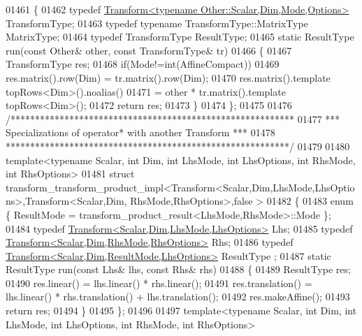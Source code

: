\begin{DoxyCode}
01461 \{
01462   \textcolor{keyword}{typedef} \hyperlink{group___geometry___module_class_eigen_1_1_transform}{Transform<typename Other::Scalar,Dim,Mode,Options>}
       TransformType;
01463   \textcolor{keyword}{typedef} \textcolor{keyword}{typename} TransformType::MatrixType MatrixType;
01464   \textcolor{keyword}{typedef} TransformType ResultType;
01465   \textcolor{keyword}{static} ResultType run(\textcolor{keyword}{const} Other& other, \textcolor{keyword}{const} TransformType& tr)
01466   \{
01467     TransformType res;
01468     \textcolor{keywordflow}{if}(Mode!=\textcolor{keywordtype}{int}(AffineCompact))
01469       res.matrix().row(Dim) = tr.matrix().row(Dim);
01470     res.matrix().template topRows<Dim>().noalias()
01471       = other * tr.matrix().template topRows<Dim>();
01472     \textcolor{keywordflow}{return} res;
01473   \}
01474 \};
01475 
01476 \textcolor{comment}{/**********************************************************}
01477 \textcolor{comment}{*** Specializations of operator* with another Transform ***}
01478 \textcolor{comment}{**********************************************************/}
01479 
01480 \textcolor{keyword}{template}<\textcolor{keyword}{typename} Scalar, \textcolor{keywordtype}{int} Dim, \textcolor{keywordtype}{int} LhsMode, \textcolor{keywordtype}{int} LhsOptions, \textcolor{keywordtype}{int} RhsMode, \textcolor{keywordtype}{int} RhsOptions>
01481 \textcolor{keyword}{struct }transform\_transform\_product\_impl<Transform<Scalar,Dim,LhsMode,LhsOptions>,Transform<Scalar,Dim,
      RhsMode,RhsOptions>,false >
01482 \{
01483   \textcolor{keyword}{enum} \{ ResultMode = transform\_product\_result<LhsMode,RhsMode>::Mode \};
01484   \textcolor{keyword}{typedef} \hyperlink{group___geometry___module_class_eigen_1_1_transform}{Transform<Scalar,Dim,LhsMode,LhsOptions>} Lhs;
01485   \textcolor{keyword}{typedef} \hyperlink{group___geometry___module_class_eigen_1_1_transform}{Transform<Scalar,Dim,RhsMode,RhsOptions>} Rhs;
01486   \textcolor{keyword}{typedef} \hyperlink{group___geometry___module_class_eigen_1_1_transform}{Transform<Scalar,Dim,ResultMode,LhsOptions>} ResultType
      ;
01487   \textcolor{keyword}{static} ResultType run(\textcolor{keyword}{const} Lhs& lhs, \textcolor{keyword}{const} Rhs& rhs)
01488   \{
01489     ResultType res;
01490     res.linear() = lhs.linear() * rhs.linear();
01491     res.translation() = lhs.linear() * rhs.translation() + lhs.translation();
01492     res.makeAffine();
01493     \textcolor{keywordflow}{return} res;
01494   \}
01495 \};
01496 
01497 \textcolor{keyword}{template}<\textcolor{keyword}{typename} Scalar, \textcolor{keywordtype}{int} Dim, \textcolor{keywordtype}{int} LhsMode, \textcolor{keywordtype}{int} LhsOptions, \textcolor{keywordtype}{int} RhsMode, \textcolor{keywordtype}{int} RhsOptions>

\end{DoxyCode}
